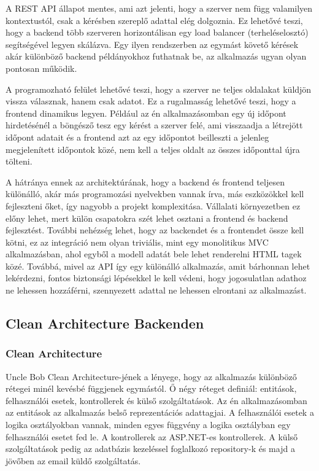 A REST API állapot mentes, ami azt jelenti, hogy a szerver nem függ valamilyen kontextustól, csak a kérésben szereplő adattal elég dolgoznia. Ez lehetővé teszi, hogy a backend több szerveren horizontálisan egy load balancer (terheléselosztó) segítségével legyen skálázva. Egy ilyen rendszerben az egymást követő kérések akár különböző backend példányokhoz futhatnak be, az alkalmazás ugyan olyan pontosan működik.

A programozható felület lehetővé teszi, hogy a szerver ne teljes oldalakat küldjön vissza válasznak, hanem csak adatot. Ez a rugalmasság lehetővé teszi, hogy a frontend dinamikus legyen. Például az én alkalmazásomban egy új időpont hirdetésénél a böngésző tesz egy kérést a szerver felé, ami visszaadja a létrejött időpont adatait és a frontend azt az egy időpontot beilleszti a jelenleg megjelenített időpontok közé, nem kell a teljes oldalt az összes időponttal újra tölteni.

A hátránya ennek az architektúrának, hogy a backend és frontend teljesen különálló, akár más programozási nyelvekben vannak írva, más eszközökkel kell fejleszteni őket, így nagyobb a projekt komplexitása. Vállalati környezetben ez előny lehet, mert külön csapatokra szét lehet osztani a frontend és backend fejlesztést. További nehézség lehet, hogy az backendet és a frontendet össze kell kötni, ez az integráció nem olyan triviális, mint egy monolitikus MVC alkalmazásban, ahol egyből a modell adatát bele lehet renderelni HTML tagek közé. Továbbá, mivel az API így egy különálló alkalmazás, amit bárhonnan lehet lekérdezni, fontos biztonsági lépésekkel le kell védeni, hogy jogosulatlan adathoz ne lehessen hozzáférni, szennyezett adattal ne lehessen elrontani az alkalmazást.

\subsection{Clean Architecture Backenden}
\subsubsection{Clean Architecture}
Uncle Bob Clean Architecture\cite{cleanArchitecturePost}-jének a lényege, hogy az alkalmazás különböző rétegei minél kevésbé függjenek egymástól. Ő négy réteget definiál: entitások, felhasználói esetek, kontrollerek és külső szolgáltatások. Az én alkalmazásomban az entitások az alkalmazás belső reprezentációs adattagjai. A felhasználói esetek a logika osztályokban vannak, minden egyes függvény a logika osztályban egy felhasználói esetet fed le. A kontrollerek az ASP.NET-es kontrollerek. A külső szolgáltatások pedig az adatbázis kezeléssel foglalkozó repository-k és majd a jövőben az email küldő szolgáltatás.

